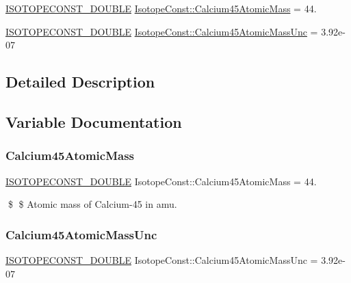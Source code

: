 \begin{DoxyCompactItemize}
\item 
\mbox{\hyperlink{group___isotope_const-_macros_ga8f45a7272ce02c0b4c65c44636ed719a}{I\+S\+O\+T\+O\+P\+E\+C\+O\+N\+S\+T\+\_\+\+D\+O\+U\+B\+LE}} \mbox{\hyperlink{group___isotope_const-_calcium-_ca45_gaaf252ab378f1f24dbea2808619000ef9}{Isotope\+Const\+::\+Calcium45\+Atomic\+Mass}} = 44.
\item 
\mbox{\hyperlink{group___isotope_const-_macros_ga8f45a7272ce02c0b4c65c44636ed719a}{I\+S\+O\+T\+O\+P\+E\+C\+O\+N\+S\+T\+\_\+\+D\+O\+U\+B\+LE}} \mbox{\hyperlink{group___isotope_const-_calcium-_ca45_ga31549f6a5aa0f10cbefbda8aa5e832c9}{Isotope\+Const\+::\+Calcium45\+Atomic\+Mass\+Unc}} = 3.\+92e-\/07
\end{DoxyCompactItemize}


\subsection{Detailed Description}


\subsection{Variable Documentation}
\mbox{\label{group___isotope_const-_calcium-_ca45_gaaf252ab378f1f24dbea2808619000ef9}} 
\subsubsection{\texorpdfstring{Calcium45\+Atomic\+Mass}{Calcium45AtomicMass}}
{\footnotesize\ttfamily \mbox{\hyperlink{group___isotope_const-_macros_ga8f45a7272ce02c0b4c65c44636ed719a}{I\+S\+O\+T\+O\+P\+E\+C\+O\+N\+S\+T\+\_\+\+D\+O\+U\+B\+LE}} Isotope\+Const\+::\+Calcium45\+Atomic\+Mass = 44.}

\$ \$ Atomic mass of Calcium-\/45 in amu. \mbox{\label{group___isotope_const-_calcium-_ca45_ga31549f6a5aa0f10cbefbda8aa5e832c9}} 
\subsubsection{\texorpdfstring{Calcium45\+Atomic\+Mass\+Unc}{Calcium45AtomicMassUnc}}
{\footnotesize\ttfamily \mbox{\hyperlink{group___isotope_const-_macros_ga8f45a7272ce02c0b4c65c44636ed719a}{I\+S\+O\+T\+O\+P\+E\+C\+O\+N\+S\+T\+\_\+\+D\+O\+U\+B\+LE}} Isotope\+Const\+::\+Calcium45\+Atomic\+Mass\+Unc = 3.\+92e-\/07}

